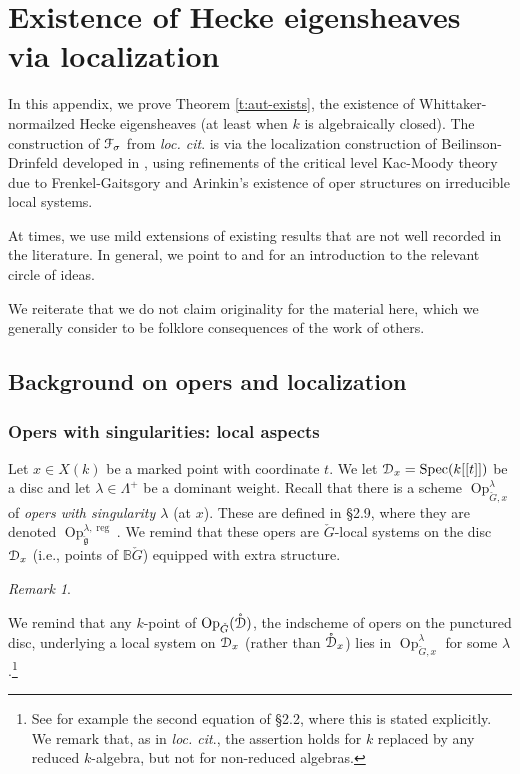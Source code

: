 \documentclass[reqno,11pt]{amsart}
\numberwithin{equation}{subsection}
\theoremstyle{remark}
\newtheorem{rem}[thm]{Remark}
\newcommand{\bB}{{\mathbb B}}
\newcommand{\sD}{{\EuScript D}}
\newcommand{\sF}{{\EuScript F}}
\newcommand{\fg}{{\mathfrak g}}
\newcommand{\on}{\operatorname}
\newcommand{\Spec}{\on{Spec}}
\newcommand{\Op}{\on{Op}}
\renewcommand{\o}[1]{\mathring{#1}}
\begin{document}
\appendix

\section{Existence of Hecke eigensheaves via localization}\label{a:localization}

In this appendix, we prove Theorem \ref{t:aut-exists}, the existence
of Whittaker-normailzed Hecke eigensheaves (at least 
when $k$ is algebraically closed).
The construction of $\sF_{\sigma}$ from \emph{loc. cit}. 
is via the localization construction
of Beilinson-Drinfeld developed in \cite{hitchin}, using refinements of the
critical level Kac-Moody theory due to Frenkel-Gaitsgory and Arinkin's
existence of oper structures on irreducible local systems.

At times, we use mild extensions of existing results that are not 
well recorded in the
literature. In general, we point to \cite{jerusalem2014} and \cite{charles-lin}
for an introduction to the relevant circle of ideas.

We reiterate that we do not claim originality for the material here,
which we generally consider to be folklore consequences of the
work of others.

\subsection{Background on opers and localization}\label{ss:opers}

\subsubsection{Opers with singularities: local aspects}

Let $x \in X(k)$ be a marked point with coordinate $t$. 
We let $\sD_x = \Spec(k[[t]])$ be a disc and let $\lambda \in \Lambda^+$
be a dominant weight. Recall that there is a scheme
$\Op_{\check{G},x}^{\lambda}$ of \emph{opers with singularity $\lambda$} (at $x$).
These are defined in \cite{fg2} \S 2.9, where
they are denoted $\Op_{\check{\fg}}^{\lambda,\on{reg}}$. We remind that
these opers are $\check{G}$-local systems on the disc $\sD_x$ 
(i.e., points of $\bB \check{G}$) equipped with extra structure.

\begin{rem}\label{r:mf,red->reg}

We remind that any $k$-point of $\Op_{\check{G}}(\o{\sD})$, the indscheme of
opers on the punctured disc, underlying a local system on $\sD_x$ (rather
than $\o{\sD}_x$) lies in $\Op_{\check{G},x}^{\lambda}$ for some 
$\lambda$.\footnote{See for example the second equation of \cite{fg-spherical}
\S 2.2, where this is stated explicitly. We remark that, as in \emph{loc. cit}., 
the assertion holds for $k$ replaced by any reduced $k$-algebra, but not
for non-reduced algebras.} 

\end{rem}
\end{document}
